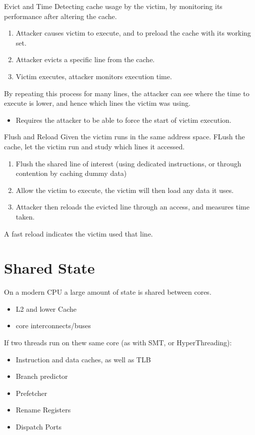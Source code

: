 \begin{definitionbox}{Evict and Time}
    Detecting cache usage by the victim, by monitoring its performance after altering the cache.
    \begin{enumerate}
        \item Attacker causes victim to execute, and to preload the cache with its working set.
        \item Attacker evicts a specific line from the cache.
        \item Victim executes, attacker monitors execution time.
    \end{enumerate}
    By repeating this process for many lines, the attacker can see where the time to execute is lower, and hence which lines the victim was using.
    \begin{itemize}
        \item Requires the attacker to be able to force the start of victim execution.
    \end{itemize}
\end{definitionbox}

\begin{definitionbox}{Flush and Reload}
    Given the victim runs in the same address space. FLush the cache, let the victim run and study which lines it accessed.
    \begin{enumerate}
        \item Flush the shared line of interest (using dedicated instructions, or through contention by caching dummy data)
        \item Allow the victim to execute, the victim will then load any data it uses.
        \item Attacker then reloads the evicted line through an access, and measures time taken.
    \end{enumerate}
    A fast reload indicates the victim used that line.
\end{definitionbox}

\section{Shared State}
On a modern CPU a large amount of state is shared between cores.
\begin{itemize}
    \item L2 and lower Cache
    \item core interconnects/buses
\end{itemize}
If two threads run on thew same core (as with SMT, or HyperThreading):
\begin{itemize}
    \item Instruction and data caches, as well as TLB
    \item Branch predictor
    \item Prefetcher
    \item Rename Registers
    \item Dispatch Ports
\end{itemize}

